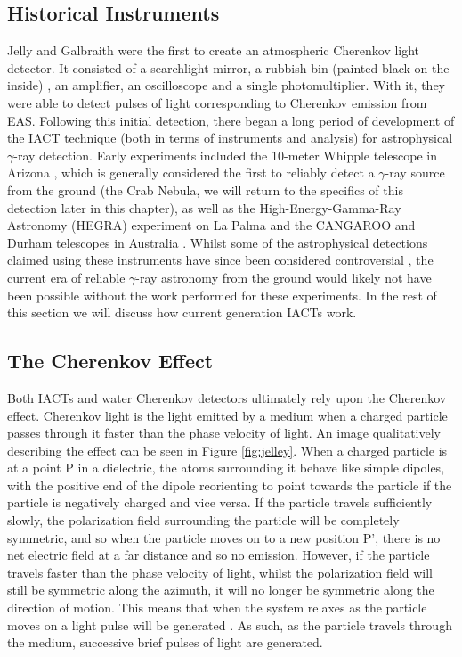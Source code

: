\subsection{Historical Instruments}
Jelly and Galbraith \cite{G+J} were the first to create an atmospheric Cherenkov light detector. It consisted of a searchlight mirror, a rubbish bin (painted black on the inside) , an amplifier, an oscilloscope and a single photomultiplier. With it, they were able to detect pulses of light corresponding to Cherenkov emission from EAS. Following this initial detection, there began a long period of development of the IACT technique (both in terms of instruments and analysis) for astrophysical $\gamma$-ray detection. Early experiments included the 10-meter Whipple telescope in Arizona \cite{whipple}, which is generally considered the first to reliably detect a $\gamma$-ray source from the ground (the Crab Nebula, we will return to the specifics of this detection later in this chapter), as well as the High-Energy-Gamma-Ray Astronomy (HEGRA) experiment on La Palma \cite{HEGRA} and the CANGAROO and Durham telescopes in Australia \cite{CANGAROO} \cite{DURHAM}. Whilst some of the astrophysical detections claimed using these instruments have since been considered controversial \cite{hintonicrc30}, the current era of reliable $\gamma$-ray astronomy from the ground would likely not have been possible without the work performed for these experiments. In the rest of this section we will discuss how current generation IACTs work. 

\subsection{The Cherenkov Effect}
Both IACTs and water Cherenkov detectors ultimately rely upon the Cherenkov effect. Cherenkov light is the light emitted by a medium when a charged particle passes through it faster than the phase velocity of light. An image qualitatively describing the effect can be seen in Figure \ref{fig:jelley}. When a charged particle is at a point P in a dielectric, the atoms surrounding it behave like simple dipoles, with the positive end of the dipole reorienting to point towards the particle if the particle is negatively charged and vice versa. If the particle travels sufficiently slowly, the polarization field surrounding the particle will be completely symmetric, and so when the particle moves on to a new position P', there is no net electric field at a far distance and so no emission. However, if the particle travels faster than the phase velocity of light, whilst the polarization field will still be symmetric along the azimuth, it will no longer be symmetric along the direction of motion. This means that when the system relaxes as the particle moves on a light pulse will be generated \cite{jelley}. As such, as the particle travels through the medium, successive brief pulses of light are generated. 

